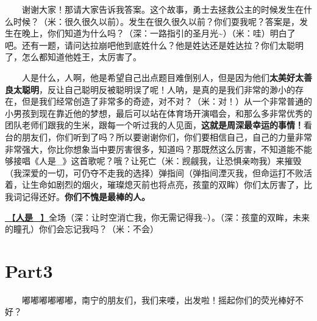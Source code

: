 \documentclass[]{ctexbook}
\begin{document}
  谢谢大家！那请大家告诉我答案。这个故事，勇士去拯救公主的时候发生在什么时候？（米：很久很久以前）。发生在很久很久以前？你们耍我呢？答案是，发生在晚上，你们知道为什么吗？（深：一路指引的圣月光\textasciitilde）（米：哇）明白了吧。还有一题，请问达拉崩吧他到底姓什么？他是姓达还是姓达拉？你们太聪明了，怎么都知道他姓王，太厉害了。

  人是什么，人啊，他是希望自己出点题目难倒别人，但是因为他们\textbf{太美好太善良太聪明}，反让自己聪明反被聪明误了呢！人呐，是真的是我们非常的渺小的存在，但是我们经常创造了非常多的奇迹，对不对？（米：对！）从一个非常普通的小男孩到现在靠近他的梦想，最后可以站在体育场开演唱会，和那么多非常优秀的团队老师们跟我的生米，跟每一个听过我的人见面，\textbf{这就是周深最幸运的事情！}看台的朋友们，你们听到了吗？所以要谢谢你们，你们要相信自己，自己的力量非常非常强大，你比你想象当中要厉害很多，知道吗？那既然这么厉害，不知道能不能够接唱《人是\_》这首歌呢？哦？让死亡（米：觊觎我，让恐惧亲吻我）来摧毁（我深爱的一切，可仍夺不走我的选择）弹指间（弹指间湮灭我，但命运打不败活着，让生命如剧烈的烟火，璀璨熄灭前也将点亮，孩童的双眸）你们太厉害了，比我词记得还好。\textbf{你们不愧是最棒的人。}

\hyperref[renshi]{🎵【\textbf{人是\_}】}全场（深：让时空消亡我，你无需记得我\textasciitilde）。（深：孩童的双眸，未来的瞳孔）你们会忘记我吗？（米：不会）

\section{Part3}\label{nanning-20241206-part3}

  嘟嘟嘟嘟嘟嘟，南宁的朋友们，我们来喽，出发啦！摇起你们的荧光棒好不好？
\end{document}

